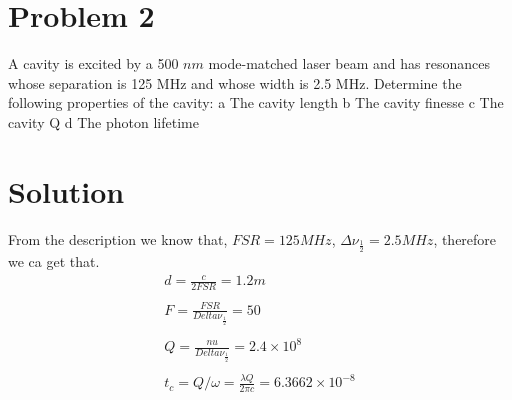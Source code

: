 \documentclass{article}
\begin{document}
\begin{figure}[htb]
    \centering
    \hspace{0.5in}
    \label{fig2}  %
\end{figure}
\section{Problem 2}
A cavity is excited by a 500 $nm$ mode-matched laser beam and has resonances whose separation is 125 MHz and whose width is 2.5 MHz. Determine the following properties of the cavity:
\quad a The cavity length
\quad b The cavity finesse
\quad c The cavity Q
\quad d The photon lifetime
\section*{Solution}
From the description we know that, $FSR=125MHz$, $\Delta \nu_{\frac{1}{2}}=2.5MHz$, therefore we ca get that.
\begin{equation}\label{key}
	\begin{array}{l}
		d=\frac{c}{2FSR}=1.2m\\
		\\
		F=\frac{FSR}{Delta \nu_{\frac{1}{2}}}=50\\
		\\
		Q=\frac{nu}{Delta \nu_{\frac{1}{2}}}=2.4\times 10^8\\
		\\
		t_c=Q/\omega=\frac{\lambda Q}{2\pi c}=6.3662\times 10^{-8}
	\end{array}
\end{equation}
\end{document}
